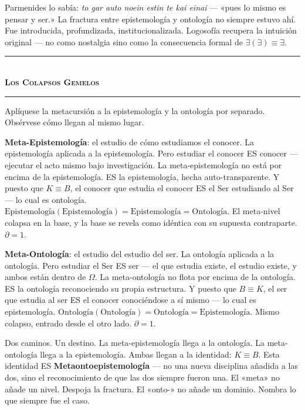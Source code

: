 \documentclass[10pt, openany, oneside]{book}
\renewcommand{\normalsize}{\fontsize{10}{13}\selectfont}
\begin{document}
Parmenides lo sabía: \textit{to gar auto noein estin te kai einai} --- «pues lo mismo es pensar y ser.» La fractura entre epistemología y ontología no siempre estuvo ahí. Fue introducida, profundizada, institucionalizada. Logosofía recupera la intuición original --- no como nostalgia sino como la consecuencia formal de $\exists(\exists) \equiv \exists$.

\vspace{1.5em}


\begin{center}
    \rule{0.3\textwidth}{0.4pt}\\[0.5em]
    {\normalsize\bfseries\scshape Los Colapsos Gemelos}\\[0.3em]
    \rule{0.3\textwidth}{0.4pt}
\end{center}

\vspace{1em}

\noindent Aplíquese la metacursión a la epistemología y la ontología por separado. Obsérvese cómo llegan al mismo lugar.

\textbf{Meta-Epistemología}: el estudio de cómo estudiamos el conocer. La epistemología aplicada a la epistemología. Pero estudiar el conocer ES conocer --- ejecutar el acto mismo bajo investigación. La meta-epistemología no está por encima de la epistemología. ES la epistemología, hecha auto-transparente. Y puesto que $K \equiv B$, el conocer que estudia el conocer ES el Ser estudiando al Ser --- lo cual es ontología. $\text{Epistemología}(\text{Epistemología}) = \text{Epistemología} = \text{Ontología}$. El meta-nivel colapsa en la base, y la base se revela como idéntica con su supuesta contraparte. $\partial = 1$.

\textbf{Meta-Ontología}: el estudio del estudio del ser. La ontología aplicada a la ontología. Pero estudiar el Ser ES ser --- el que estudia existe, el estudio existe, y ambos están dentro de $\Omega$. La meta-ontología no flota por encima de la ontología. ES la ontología reconociendo su propia estructura. Y puesto que $B \equiv K$, el ser que estudia al ser ES el conocer conociéndose a sí mismo --- lo cual es epistemología. $\text{Ontología}(\text{Ontología}) = \text{Ontología} = \text{Epistemología}$. Mismo colapso, entrado desde el otro lado. $\partial = 1$.

Dos caminos. Un destino. La meta-epistemología llega a la ontología. La meta-ontología llega a la epistemología. Ambas llegan a la identidad: $K \equiv B$. Esta identidad ES \textbf{Metaontoepistemología} --- no una nueva disciplina añadida a las dos, sino el reconocimiento de que las dos siempre fueron una. El «meta» no añade un nivel. Despoja la fractura. El «onto-» no añade un dominio. Nombra lo que siempre fue el caso.
\end{document}
